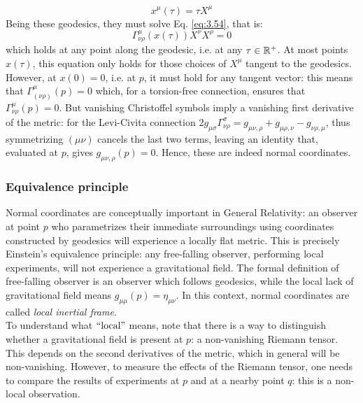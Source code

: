 \begin{equation*}
  x^\mu (\tau) = \tau X^\mu
\end{equation*}
Being these geodesics, they must solve Eq. \ref{eq:3.54}, that is:
\begin{equation*}
  \Gamma^\mu_{\nu \rho}(x(\tau)) X^\nu X^\rho = 0
\end{equation*}
which holds at any point along the geodesic, i.e. at any $ \tau \in \mathbb{R}^+ $. At most points $ x(\tau) $, this equation only holds for those choices of $ X^\mu $ tangent to the geodesics. However, at $ x(0) = 0 $, i.e. at $ p $, it must hold for any tangent vector: this means that $ \Gamma^\mu_{(\nu \rho)}(p) = 0 $ which, for a torsion-free connection, ensures that $ \Gamma^\mu_{\nu \rho}(p) = 0 $. But vanishing Christoffel symbols imply a vanishing first derivative of the metric: for the Levi-Civita connection $ 2g_{\mu \sigma} \Gamma^\sigma_{\nu \rho} = g_{\mu \nu, \rho} + g_{\mu \rho, \nu} - g_{\nu \rho, \mu} $, thus symmetrizing $ (\mu \nu) $ cancels the last two terms, leaving an identity that, evaluated at $ p $, gives $ g_{\mu \nu, \rho}(p) = 0 $. Hence, these are indeed normal coordinates.

\subsubsection{Equivalence principle}

Normal coordinates are conceptually important in General Relativity: an observer at point $ p $ who parametrizes their immediate surroundings using coordinates constructed by geodesics will experience a locally flat metric. This is precisely Einstein's equivalence principle: any free-falling observer, performing local experiments, will not experience a gravitational field. The formal definition of free-falling observer is an observer which follows geodesics, while the local lack of gravitational field means $ g_{\mu \mu}(p) = \eta_{\mu \nu} $. In this context, normal coordinates are called \textit{local inertial frame}.\\
To understand what $ ``\text{local}" $ means, note that there is a way to distinguish whether a gravitational field is present at $ p $: a non-vanishing Riemann tensor. This depends on the second derivatives of the metric, which in general will be non-vanishing. However, to measure the effects of the Riemann tensor, one needs to compare the results of experiments at $ p $ and at a nearby point $ q $: this is a non-local observation.

